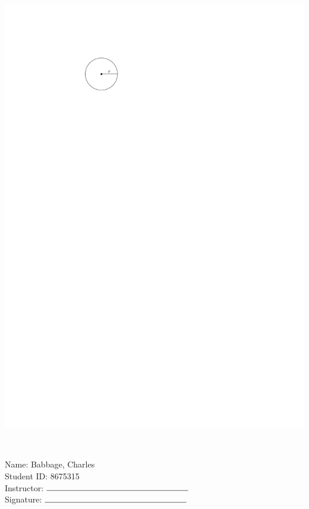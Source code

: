\documentclass[12pt]{amsart}
\begin{document}
\begin{enumerate}
\includegraphics[scale = 0.8]{circle}

\vspace{1cm}
\newpage  $ $   \newpage\end{enumerate}\graphicspath{{C:/Users/iainc/anaconda3/Randomizer/Sample Course/Sample Assessment/}}\setcounter{page}{1}


\thispagestyle{fancy}

 \noindent Name: Babbage, Charles \vspace{.3cm} \\\noindent Student ID: 8675315 \vspace{.3cm} \\\noindent Instructor: $\rule{6cm}{0.15mm}$ \vspace{.3cm} \\\noindent Signature: $\rule{6cm}{0.15mm}$ \vspace{.3cm} \\ 
\end{document}
